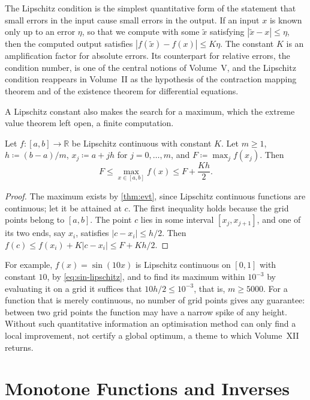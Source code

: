 The Lipschitz condition is the simplest quantitative form of the statement that small errors in the input cause small errors in the output. If an input $x$ is known only up to an error $\eta$, so that we compute with some $\tilde x$ satisfying $|\tilde x-x|\le\eta$, then the computed output satisfies $|f(\tilde x)-f(x)|\le K\eta$. The constant $K$ is an amplification factor for absolute errors. Its counterpart for relative errors, the condition number, is one of the central notions of Volume~V, and the Lipschitz condition reappears in Volume~II as the hypothesis of the contraction mapping theorem and of the existence theorem for differential equations.

A Lipschitz constant also makes the search for a maximum, which the extreme value theorem left open, a finite computation.

\begin{proposition}
\label{prop:grid-max}
Let $f\colon[a,b]\to\mathbb R$ be Lipschitz continuous with constant $K$. Let $m\ge1$, $h\coloneqq(b-a)/m$, $x_j\coloneqq a+jh$ for $j=0,\ldots,m$, and $F\coloneqq\max_jf(x_j)$. Then
\[
F\le\max_{x\in[a,b]}f(x)\le F+\frac{Kh}2 .
\]
\end{proposition}

\begin{proof}
The maximum exists by \cref{thm:evt}, since Lipschitz continuous functions are continuous; let it be attained at $c$. The first inequality holds because the grid points belong to $[a,b]$. The point $c$ lies in some interval $[x_j,x_{j+1}]$, and one of its two ends, say $x_i$, satisfies $|c-x_i|\le h/2$. Then $f(c)\le f(x_i)+K|c-x_i|\le F+Kh/2$.
\end{proof}

For example, $f(x)=\sin(10x)$ is Lipschitz continuous on $[0,1]$ with constant $10$, by \eqref{eq:sin-lipschitz}, and to find its maximum within $10^{-3}$ by evaluating it on a grid it suffices that $10h/2\le10^{-3}$, that is, $m\ge5000$. For a function that is merely continuous, no number of grid points gives any guarantee: between two grid points the function may have a narrow spike of any height. Without such quantitative information an optimisation method can only find a local improvement, not certify a global optimum, a theme to which Volume~XII returns.

\section{Monotone Functions and Inverses}
\label{sec:monotone-functions}

